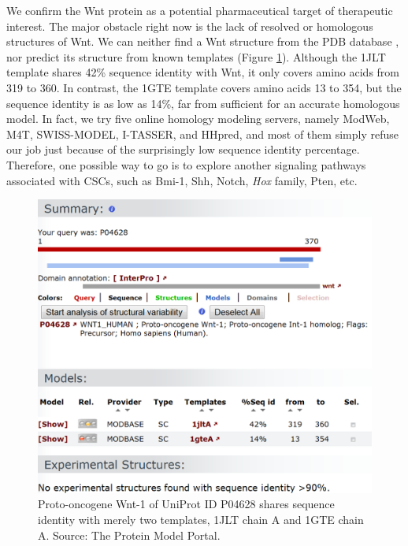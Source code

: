 We confirm the Wnt protein as a potential pharmaceutical target of therapeutic interest. The major obstacle right now is the lack of resolved or homologous structures of Wnt. We can neither find a Wnt structure from the PDB database \citep{540,537}, nor predict its structure from known templates (Figure \ref{Case:WntHomologyModeling}). Although the 1JLT template shares 42\% sequence identity with Wnt, it only covers amino acids from 319 to 360. In contrast, the 1GTE template covers amino acids 13 to 354, but the sequence identity is as low as 14\%, far from sufficient for an accurate homologous model. In fact, we try five online homology modeling servers, namely ModWeb, M4T, SWISS-MODEL, I-TASSER, and HHpred, and most of them simply refuse our job just because of the surprisingly low sequence identity percentage. Therefore, one possible way to go is to explore another signaling pathways associated with CSCs, such as Bmi-1, Shh, Notch, \textit{Hox} family, Pten, etc.

\begin{figure}
\centering
\includegraphics[width=\linewidth]{Case/WntHomologyModeling.png}
\caption{Proto-oncogene Wnt-1 of UniProt ID P04628 shares sequence identity with merely two templates, 1JLT chain A and 1GTE chain A. Source: The Protein Model Portal.}
\label{Case:WntHomologyModeling}
\end{figure}

\chapterend
